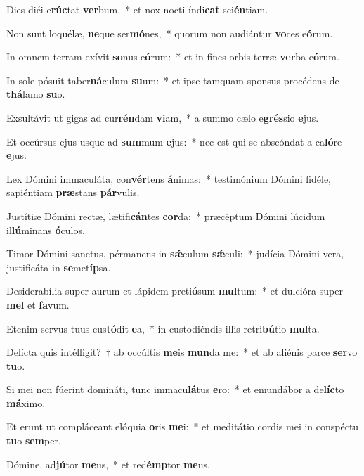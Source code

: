\item Dies diéi e\textbf{rúc}tat \textbf{ver}bum,~* et nox nocti índi\textbf{cat} sci\textbf{én}tiam.
\item Non sunt loquélæ, \textbf{ne}que ser\textbf{mó}nes,~* quorum non audiántur \textbf{vo}ces e\textbf{ó}rum.
\item In omnem terram exívit \textbf{so}nus e\textbf{ó}rum:~* et in fines orbis terræ \textbf{ver}ba e\textbf{ó}rum.
\item In sole pósuit taber\textbf{ná}culum \textbf{su}um:~* et ipse tamquam sponsus procédens de \textbf{thá}lamo \textbf{su}o.
\item Exsultávit ut gigas ad cur\textbf{rén}dam \textbf{vi}am,~* a summo cælo e\textbf{grés}sio \textbf{e}jus.
\item Et occúrsus ejus usque ad \textbf{sum}mum \textbf{e}jus:~* nec est qui se abscóndat a ca\textbf{ló}re \textbf{e}jus.
\item Lex Dómini immaculáta, con\textbf{vér}tens \textbf{á}nimas:~* testimónium Dómini fidéle, sapiéntiam \textbf{præ}stans \textbf{pár}vulis.
\item Justítiæ Dómini rectæ, lætifi\textbf{cán}tes \textbf{cor}da:~* præcéptum Dómini lúcidum il\textbf{lú}minans \textbf{ó}culos.
\item Timor Dómini sanctus, pérmanens in \textbf{sǽ}culum \textbf{sǽ}culi:~* judícia Dómini vera, justificáta in \textbf{se}met\textbf{íp}sa.
\item Desiderabília super aurum et lápidem preti\textbf{ó}sum \textbf{mul}tum:~* et dulcióra super \textbf{mel} et \textbf{fa}vum.
\item Etenim servus tuus cus\textbf{tó}dit \textbf{e}a,~* in custodiéndis illis retri\textbf{bú}tio \textbf{mul}ta.
\item Delícta quis intélligit?~† ab occúltis \textbf{me}is \textbf{mun}da me:~* et ab aliénis parce \textbf{ser}vo \textbf{tu}o.
\item Si mei non fúerint domináti, tunc immacu\textbf{lá}tus \textbf{e}ro:~* et emundábor a de\textbf{líc}to \textbf{má}ximo.
\item Et erunt ut compláceant elóquia \textbf{o}ris \textbf{me}i:~* et meditátio cordis mei in conspéctu \textbf{tu}o \textbf{sem}per.
\item Dómine, ad\textbf{jú}tor \textbf{me}us,~* et red\textbf{émp}tor \textbf{me}us.
